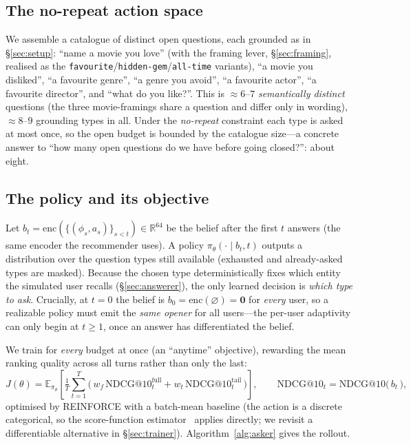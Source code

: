 \documentclass[11pt]{article}
\makeatletter
\newcommand{\R}{\mathbb{R}}
\newcommand{\ndcg}{\mathrm{NDCG@}10}
\makeatother
\begin{document}
\subsection{The no-repeat action space}
We assemble a catalogue of distinct open questions, each grounded as in \S\ref{sec:setup}: ``name a movie you love''
(with the framing lever, \S\ref{sec:framing}, realised as the \texttt{favourite}/\texttt{hidden-gem}/\texttt{all-time}
variants), ``a movie you disliked'', ``a favourite genre'', ``a genre you avoid'', ``a favourite actor'', ``a favourite
director'', and ``what do you like?''. This is $\approx 6$--$7$ \emph{semantically distinct} questions (the three
movie-framings share a question and differ only in wording), $\approx 8$--$9$ grounding types in all. Under the
\emph{no-repeat} constraint each type is asked at most once, so the open budget is bounded by the catalogue size---a
concrete answer to ``how many open questions do we have before going closed?'': about eight.

\subsection{The policy and its objective}
Let $b_t=\mathrm{enc}(\{(\phi_s,a_s)\}_{s<t})\in\R^{64}$ be the belief after the first $t$ answers (the same encoder the
recommender uses). A policy $\pi_\theta(\cdot\mid b_t,t)$ outputs a distribution over the question types still available
(exhausted and already-asked types are masked). Because the chosen type deterministically fixes which entity the
simulated user recalls (\S\ref{sec:answerer}), the only learned decision is \emph{which type to ask}. Crucially, at
$t{=}0$ the belief is $b_0=\mathrm{enc}(\varnothing)=\mathbf 0$ for \emph{every} user, so a realizable policy must emit
the \emph{same opener} for all users---the per-user adaptivity can only begin at $t\ge 1$, once an answer has
differentiated the belief.

We train for \emph{every} budget at once (an ``anytime'' objective), rewarding the mean ranking quality across all turns
rather than only the last:
\begin{equation}
\label{eq:anytime}
J(\theta)=\mathbb{E}_{\pi_\theta}\!\left[\tfrac{1}{T}\sum_{t=1}^{T}\big(\,w_f\,\ndcg^{\mathrm{full}}_t+w_t\,\ndcg^{\mathrm{tail}}_t\,\big)\right],
\qquad \ndcg_t=\ndcg\big(\,b_t\,\big),
\end{equation}
optimised by REINFORCE with a batch-mean baseline (the action is a discrete categorical, so the score-function
estimator~\cite{williams92} applies directly; we revisit a differentiable alternative in \S\ref{sec:trainer}). Algorithm~\ref{alg:asker}
gives the rollout.
\end{document}
